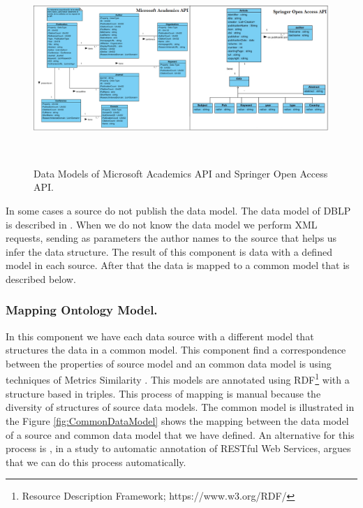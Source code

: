 \documentclass[11pt]{article}
\begin{document}
\begin{figure}[ht!]
	\centering
		\includegraphics[height=7.2cm]{modelosMA_Springer.png}
	\caption{Data Models of Microsoft Academics API and Springer Open Access API.}
	\label{fig:ModelMaSO}
\end{figure}

In some cases a source do not publish the data model. 
The data model of DBLP is described in \cite{ley2009dblp}.
When we do not know the data model we perform XML requests, sending as parameters the author names to the source that helps us infer the  data structure. The result of this component is data with a defined model in each source. After that the data is mapped to a common model that is described below.

\subsubsection{Mapping Ontology Model.}

In this component we have each data source with a different model that structures the data in a common model. This component find a correspondence between the properties of  source model and an common data model is using techniques of Metrics Similarity \cite{Charikar2002SimilarityET}. This models are annotated using RDF\footnote{Resource Description Framework; https://www.w3.org/RDF/}  with a structure based in triples. This process of mapping is manual because the diversity of structures of source data models. The common model is illustrated in the Figure \ref{fig:CommonDataModel} shows the mapping between the data model of  a source and common data model that we have defined. 
An alternative for this process is \cite{Ortiz}, in a study to automatic annotation of RESTful Web Services, argues that we can do this process automatically.
\end{document}
